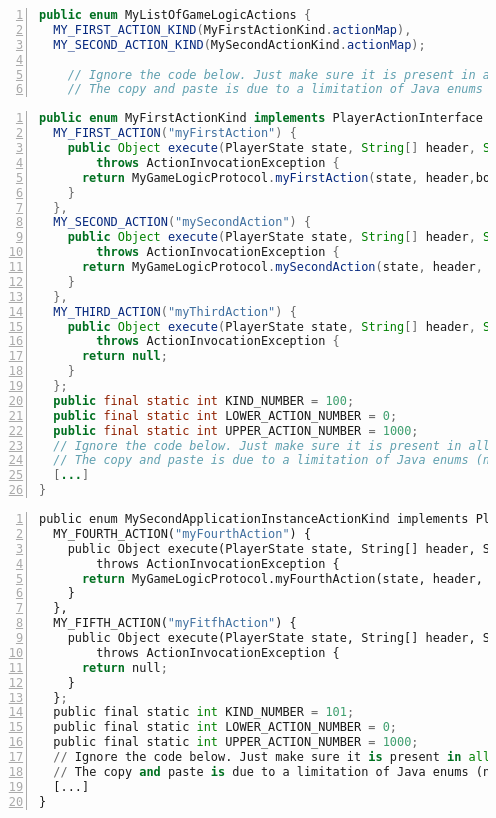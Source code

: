 \begin{lstlisting}[float=htbp,frame=bt,basicstyle=\scriptsize\sffamily,numbers=left,
   numberstyle=\tiny, stepnumber=1,
    numbersep=5pt,language=java,label=L-applicationinstanceactionkinds,caption=List of action kinds of the state machine for the game logic of the player]
public enum MyListOfGameLogicActions {
  MY_FIRST_ACTION_KIND(MyFirstActionKind.actionMap),
  MY_SECOND_ACTION_KIND(MySecondActionKind.actionMap);
	
	// Ignore the code below. Just make sure it is present in all your enums.
	// The copy and paste is due to a limitation of Java enums (no inheritance).
\end{lstlisting}

\begin{lstlisting}[float=htbp,frame=bt,basicstyle=\scriptsize\sffamily,numbers=left,
   numberstyle=\tiny, stepnumber=1,
    numbersep=5pt,language=java,label=L-applicationinstanceactionsone,caption=Player's actions of the first action kind]
public enum MyFirstActionKind implements PlayerActionInterface {
  MY_FIRST_ACTION("myFirstAction") {
    public Object execute(PlayerState state, String[] header, String body)
        throws ActionInvocationException {
      return MyGameLogicProtocol.myFirstAction(state, header,body);
    }
  },
  MY_SECOND_ACTION("mySecondAction") {
    public Object execute(PlayerState state, String[] header, String body)
        throws ActionInvocationException {
      return MyGameLogicProtocol.mySecondAction(state, header, body);
    }
  },
  MY_THIRD_ACTION("myThirdAction") {
    public Object execute(PlayerState state, String[] header, String body)
        throws ActionInvocationException {
      return null;
    }
  };
  public final static int KIND_NUMBER = 100;
  public final static int LOWER_ACTION_NUMBER = 0;
  public final static int UPPER_ACTION_NUMBER = 1000;
  // Ignore the code below. Just make sure it is present in all your enums.
  // The copy and paste is due to a limitation of Java enums (no inheritance).
  [...]
}
\end{lstlisting}

\begin{lstlisting}[float=htbp,frame=bt,basicstyle=\scriptsize\sffamily,numbers=left,
   numberstyle=\tiny, stepnumber=1,
    numbersep=5pt,language=python,label=L-applicationinstanceactionstwo,caption=Player's actions of the second action kind]
public enum MySecondApplicationInstanceActionKind implements PlayerActionInterface {
  MY_FOURTH_ACTION("myFourthAction") {
    public Object execute(PlayerState state, String[] header, String body)
        throws ActionInvocationException {
      return MyGameLogicProtocol.myFourthAction(state, header, body);
    }
  },
  MY_FIFTH_ACTION("myFitfhAction") {
    public Object execute(PlayerState state, String[] header, String body)
        throws ActionInvocationException {
      return null;
    }
  };
  public final static int KIND_NUMBER = 101;
  public final static int LOWER_ACTION_NUMBER = 0;
  public final static int UPPER_ACTION_NUMBER = 1000;
  // Ignore the code below. Just make sure it is present in all your enums.
  // The copy and paste is due to a limitation of Java enums (no inheritance).
  [...]
}
\end{lstlisting}

